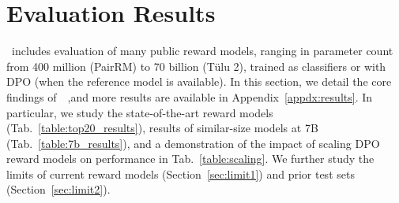 
\section{Evaluation Results}
\label{sec:eval}
\name~includes evaluation of many public reward models, ranging in parameter count from 400 million (PairRM) to 70 billion (Tülu 2), trained as classifiers or with DPO (when the reference model is available).
In this section, we detail the core findings of~\name~,and more results are available in Appendix~\ref{appdx:results}. 
In particular, we study the state-of-the-art reward models (Tab.~\ref{table:top20_results}), results of similar-size models at 7B (Tab.~\ref{table:7b_results}), and a demonstration of the impact of scaling DPO reward models on performance in Tab.~\ref{table:scaling}. 
We further study the limits of current reward models (Section~\ref{sec:limit1}) and prior test sets (Section~\ref{sec:limit2}).%






